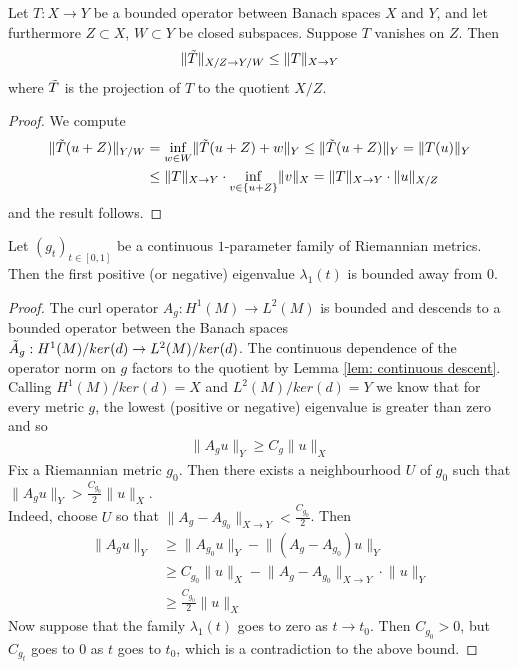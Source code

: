 \begin{lem}
\label{lem: continuous descent}
    Let $T:X\to Y$ be a bounded operator between Banach spaces $X$ and $Y$, and let furthermore $Z\subset X$, $W\subset Y$ be closed subspaces. Suppose $T$ vanishes on $Z$. Then 
    \begin{align*}
        \lVert \Tilde{T} \rVert_{X/Z\to Y/W}\leq \lVert T \rVert_{X\to Y}
    \end{align*}
    where $\Tilde{T}$ is the projection of $T$ to the quotient $X/Z$.
\end{lem}
\begin{proof}
We compute
\begin{align*}
    \lVert \Tilde{T} (u+Z) \rVert_{Y/W} &=\inf_{w\in W} \lVert \Tilde{T}(u+Z)+w \rVert_{Y}\leq \lVert \Tilde{T}(u+Z) \rVert_{Y}=\lVert T(u)\rVert_Y \\
    & \leq\lVert T\rVert_{X\to Y} \cdot\inf_{v\in \{u+Z\}} \lVert v\rVert_{X}=\lVert T\rVert_{X\to Y} \cdot\lVert u\rVert_{X/Z}
\end{align*}
and the result follows.
\end{proof}

\begin{lem}
\label{lem: nonvanishing of eigenvalues along one parameter families}
Let $(g_t)_{t\in [0,1]}$ be a continuous $1$-parameter family of Riemannian metrics. Then the first positive (or negative) eigenvalue $\lambda_1(t)$ is bounded away from $0$. 
\end{lem}
\begin{proof}
The curl operator $A_g:H^1 (M)\to L^2 (M)$ is bounded and descends to a bounded operator between the Banach spaces $\Tilde{A}_g: H^1(M)/ker(d)\to L^2 (M)/ker(d)$. The continuous dependence of the operator norm on $g$ factors to the quotient by Lemma \ref{lem: continuous descent}. Calling $H^1(M)/ker(d)=X$ and $L^2(M)/ker(d)=Y$ we know that for every metric $g$, the lowest (positive or negative) eigenvalue is greater than zero and so
\begin{align*}
    \lVert A_g u\rVert_Y \geq C_g \lVert u\rVert_X
\end{align*}
Fix a Riemannian metric $g_0$. Then there exists a neighbourhood $U$ of $g_0$ such that $\lVert A_g u\rVert_Y > \frac{C_{g_0}}{2}\lVert u\rVert_X$.\\
Indeed, choose $U$ so that $\lVert A_g-A_{g_0}\rVert_{X\to Y}< \frac{C_{g_0}}{2}$. Then
\begin{align*}
    \lVert A_g u\rVert_Y &\geq \lVert A_{g_0} u\rVert_Y - \lVert (A_g-A_{g_0})u\rVert_Y\\
    &\geq C_{g_0}\lVert u\rVert_X - \lVert A_g-A_{g_0}\rVert_{X\to Y}\cdot \lVert u\rVert_Y\\
    & \geq \frac{C_{g_0}}{2}\lVert u\rVert_{X}
\end{align*}
Now suppose that the family $\lambda_1 (t)$ goes to zero as $t\to t_0$. Then $C_{g_0}>0$, but $C_{g_t}$ goes to $0$ as $t$ goes to $t_0$, which is a contradiction to the above bound.
\end{proof}

